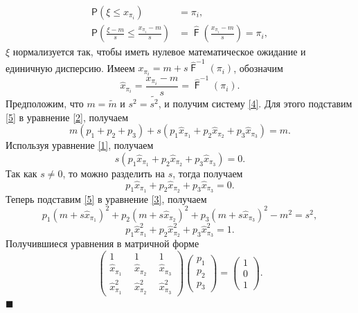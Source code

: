 \documentclass[12pt]{article}
\newenvironment{Proof}{\par\noindent{\bf Доказательство.}}{\hfill$\scriptstyle\blacksquare$}
\DeclareMathOperator{\F}{\mathsf{F}}
\begin{document}
	\begin{Proof}
		\begin{align*}
			\mathsf{P}(\xi \leq x_{\pi_{i}}) &= \pi_{i},\\
			\mathsf{P}\left(\frac{\xi-m}{s}\leq \frac{x_{\pi_{i}}-m}{s}\right) &=  \hat{\F}\left(\frac{x_{\pi_{i}}-m}{s}\right)=\pi_{i},
		\end{align*}
		$\xi$ нормализуется так, чтобы иметь нулевое математическое ожидание и единичную дисперсию.
		Имеем $x_{\pi_{i}} = m+s\hat{\F}^{-1}(\pi_{i})$, обозначим
		\begin{equation}
			\hat{x}_{\pi_{i}} = \dfrac{x_{\pi_{i}}-m}{s}=\hat{\F}^{-1}(\pi_{i}). \label{5}
		\end{equation}
		Предположим, что $m=\tilde{m}$ и $s^{2} = \tilde{s^{2}}$, и получим систему \eqref{4}.
		Для этого подставим \eqref{5} в уравнение \eqref{2}, получаем
		\begin{equation*}
			m(p_{1} + p_{2} + p_{3})+s(p_{1}\hat{x}_{\pi_1}+p_{2}\hat{x}_{\pi_{2}}+p_{3}\hat{x}_{\pi_{3}})=m.
		\end{equation*}
		Используя уравнение \eqref{1}, получаем
		\begin{equation*}
			s(p_{1}\hat{x}_{\pi_1}+p_{2}\hat{x}_{\pi_{2}}+p_{3}\hat{x}_{\pi_{3}})=0.
		\end{equation*}
		Так как $s \neq 0$, то можно разделить на $s$, тогда получаем
		\begin{equation*}
			p_{1}\hat{x}_{\pi_1}+p_{2}\hat{x}_{\pi_{2}}+p_{3}\hat{x}_{\pi_{3}}=0.
		\end{equation*}
		Теперь подставим \eqref{5} в уравнение \eqref{3}, получаем
		\begin{equation*}
			p_{1}(m+s\hat{x}_{\pi_{1}})^{2}+p_{2}(m+s\hat{x}_{\pi_{2}})^{2}+p_{3}(m+s\hat{x}_{\pi_{3}})^{2} - m^{2} = s^{2},
		\end{equation*}
		\begin{equation*}
			p_{1}\hat{x}_{\pi_{1}}^{2}+p_{2}\hat{x}_{\pi_{2}}^{2}+p_{3}\hat{x}_{\pi_{3}}^{2} = 1.
		\end{equation*}
		Получившиеся уравнения в матричной форме
		\begin{equation}
			\begin{pmatrix} 
				1&1&1\\ 
				\hat{x}_{\pi_{1}}~~ &  \hat{x}_{\pi_{2}}~~  & \hat{x}_{\pi_{3}} \\ 
				\hat{x}_{\pi_{1}}^{2}~~&\hat{x}_{\pi_{2}}^{2}~~  &\hat{x}_{\pi_{3}}^{2}
			\end{pmatrix}
			\begin{pmatrix}p_{1}\\p_{2}\\ p_{3}\end{pmatrix}= \begin{pmatrix}1\\0\\1 \end{pmatrix}. \label{6}
		\end{equation}
	\end{Proof}
	
\end{document}
